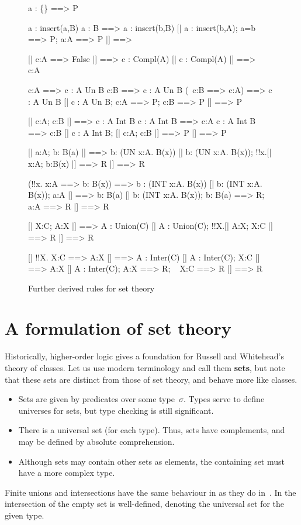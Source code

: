 \begin{figure} \makeatother
\begin{ttbox}
   a : \{\} ==> P

 a : insert(a,B)
 a : B ==> a : insert(b,B)
  [| a : insert(b,A);  a=b ==> P;  a:A ==> P |] ==> 

   [| c:A ==> False |] ==> c : Compl(A)
   [| c : Compl(A) |] ==> ~ c:A

     c:A ==> c : A Un B
     c:B ==> c : A Un B
     (~c:B ==> c:A) ==> c : A Un B
      [| c : A Un B;  c:A ==> P;  c:B ==> P |] ==> P

     [| c:A;  c:B |] ==> c : A Int B
    c : A Int B ==> c:A
    c : A Int B ==> c:B
     [| c : A Int B;  [| c:A; c:B |] ==> P |] ==> P

     [| a:A;  b: B(a) |] ==> b: (UN x:A. B(x))
     [| b: (UN x:A. B(x));  !!x.[| x:A;  b:B(x) |] ==> R |] ==> R

    (!!x. x:A ==> b: B(x)) ==> b : (INT x:A. B(x))
    [| b: (INT x:A. B(x));  a:A |] ==> b: B(a)
    [| b: (INT x:A. B(x));  b: B(a) ==> R;  ~ a:A ==> R |] ==> R

   [| X:C;  A:X |] ==> A : Union(C)
   [| A : Union(C);  !!X.[| A:X;  X:C |] ==> R |] ==> R

   [| !!X. X:C ==> A:X |] ==> A : Inter(C)
   [| A : Inter(C);  X:C |] ==> A:X
   [| A : Inter(C);  A:X ==> R;  ~ X:C ==> R |] ==> R
\end{ttbox}
\caption{Further derived rules for set theory} \label{hol-set2}
\end{figure}


\section{A formulation of set theory}
Historically, higher-order logic gives a foundation for Russell and
Whitehead's theory of classes.  Let us use modern terminology and call them
{\bf sets}, but note that these sets are distinct from those of {\ZF} set
theory, and behave more like {\ZF} classes.
\begin{itemize}
\item
Sets are given by predicates over some type~$\sigma$.  Types serve to
define universes for sets, but type checking is still significant.
\item
There is a universal set (for each type).  Thus, sets have complements, and
may be defined by absolute comprehension.
\item
Although sets may contain other sets as elements, the containing set must
have a more complex type.
\end{itemize}
Finite unions and intersections have the same behaviour in {\HOL} as they
do in~{\ZF}.  In {\HOL} the intersection of the empty set is well-defined,
denoting the universal set for the given type.

